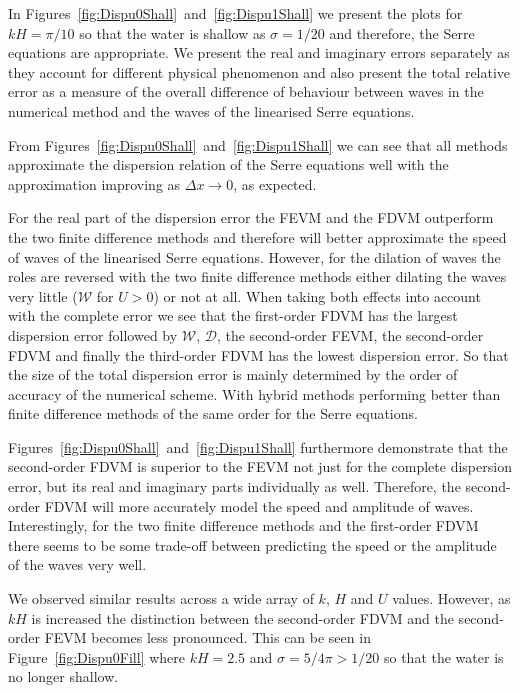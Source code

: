 In Figures~\ref{fig:Dispu0Shall}~and~\ref{fig:Dispu1Shall} we present the plots for $kH = \pi / 10$ so that the water is shallow as $\sigma = 1 / 20$ and therefore, the Serre equations are appropriate. We present the real and imaginary errors separately as they account for different physical phenomenon and also present the total relative error as a measure of the overall difference of behaviour between waves in the numerical method and the waves of the linearised Serre equations.

From Figures~\ref{fig:Dispu0Shall}~and~\ref{fig:Dispu1Shall} we can see that all methods approximate the dispersion relation of the Serre equations well with the approximation improving as $\Delta x \rightarrow 0$, as expected.

For the real part of the dispersion error the FEVM and the FDVM outperform the two finite difference methods and therefore will better approximate the speed of waves of the linearised Serre equations.  However, for the dilation of waves the roles are reversed with the two finite difference methods either dilating the waves very little ($\mathcal{W}$ for $U>0$) or not at all. When taking both effects into account with the complete error we see that the first-order FDVM has the largest dispersion error followed by $\mathcal{W}$, $\mathcal{D}$, the second-order FEVM, the second-order FDVM and finally the third-order FDVM has the lowest dispersion error. So that the size of the total dispersion error is mainly determined by the order of accuracy of the numerical scheme. With hybrid methods performing better than finite difference methods of the same order for the Serre equations. 

Figures~\ref{fig:Dispu0Shall}~and~\ref{fig:Dispu1Shall} furthermore demonstrate that the second-order FDVM is superior to the FEVM not just for the complete dispersion error, but its real and imaginary parts individually as well. Therefore, the second-order FDVM will more accurately model the speed and amplitude of waves. Interestingly, for the two finite difference methods and the first-order FDVM there seems to be some trade-off between predicting the speed or the amplitude of the waves very well. 

We observed similar results across a wide array of $k$, $H$ and $U$ values. However, as $kH$ is increased the distinction between the second-order FDVM and the second-order FEVM becomes less pronounced. This can be seen in Figure~\ref{fig:Dispu0Fill} where $kH = 2.5$ and $\sigma = 5/4 \pi > 1/20$ so that the water is no longer shallow.

